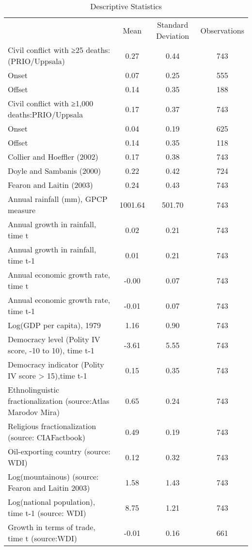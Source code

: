 \begin{table}
\caption{Descriptive Statistics}
\begin{tabular}{lccc}
 & Mean & Standard Deviation & Observations \\
Civil conflict with ≥25 deaths: (PRIO/Uppsala) & 0.27 & 0.44 & 743 \\
Onset & 0.07 & 0.25 & 555 \\
Offset & 0.14 & 0.35 & 188 \\
Civil conflict with ≥1,000 deaths:PRIO/Uppsala & 0.17 & 0.37 & 743 \\
Onset & 0.04 & 0.19 & 625 \\
Offset & 0.14 & 0.35 & 118 \\
Collier and Hoeffler (2002) & 0.17 & 0.38 & 743 \\
Doyle and Sambanis (2000) & 0.22 & 0.42 & 724 \\
Fearon and Laitin (2003) & 0.24 & 0.43 & 743 \\
Annual rainfall (mm), GPCP measure & 1001.64 & 501.70 & 743 \\
Annual growth in rainfall, time t & 0.02 & 0.21 & 743 \\
Annual growth in rainfall, time t-1 & 0.01 & 0.21 & 743 \\
Annual economic growth rate, time t & -0.00 & 0.07 & 743 \\
Annual economic growth rate, time t-1 & -0.01 & 0.07 & 743 \\
Log(GDP per capita), 1979 & 1.16 & 0.90 & 743 \\
Democracy level (Polity IV score, -10 to 10), time t-1 & -3.61 & 5.55 & 743 \\
Democracy indicator (Polity IV score > 15),time t-1 & 0.15 & 0.35 & 743 \\
Ethnolinguistic fractionalization (source:Atlas Marodov Mira) & 0.65 & 0.24 & 743 \\
Religious fractionalization (source: CIAFactbook) & 0.49 & 0.19 & 743 \\
Oil-exporting country (source: WDI) & 0.12 & 0.32 & 743 \\
Log(mountainous) (source: Fearon and Laitin 2003) & 1.58 & 1.43 & 743 \\
Log(national population), time t-1 (source: WDI) & 8.75 & 1.21 & 743 \\
Growth in terms of trade, time t (source:WDI) & -0.01 & 0.16 & 661 \\
\end{tabular}
\end{table}
